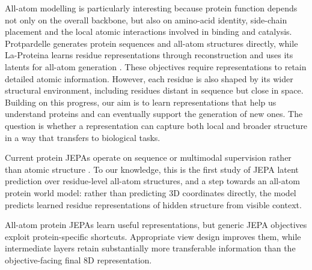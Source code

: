 \documentclass{article}
\begin{document}
All-atom modelling is particularly interesting because protein function depends not only on the overall backbone, but also on amino-acid identity, side-chain placement and the local atomic interactions involved in binding and catalysis. Protpardelle generates protein sequences and all-atom structures directly, while La-Proteina learns residue representations through reconstruction and uses its latents for all-atom generation \citep{chu2024allatom,la-proteina}. These objectives require representations to retain detailed atomic information. However, each residue is also shaped by its wider structural environment, including residues distant in sequence but close in space. Building on this progress, our aim is to learn representations that help us understand proteins and can eventually support the generation of new ones. The question is whether a representation can capture both local and broader structure in a way that transfers to biological tasks.


Current protein JEPAs operate on sequence or multimodal supervision rather than atomic structure \citep{ofer2026proteinjepa,ravideshik2026protjepa}. To our knowledge, this is the first study of JEPA latent prediction over residue-level all-atom structures, and a step towards an all-atom protein world model: rather than predicting 3D coordinates directly, the model predicts learned residue representations of hidden structure from visible context.

All-atom protein JEPAs learn useful representations, but generic JEPA objectives exploit protein-specific shortcuts. Appropriate view design improves them, while intermediate layers retain substantially more transferable information than the objective-facing final 8D representation.
\end{document}

